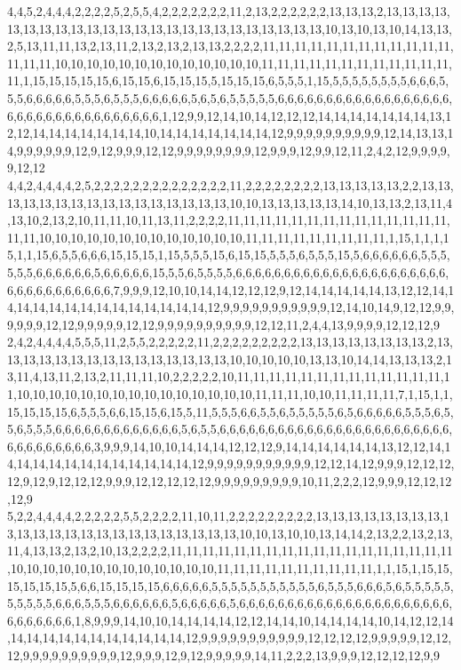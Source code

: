 4,4,5,2,4,4,4,2,2,2,2,5,2,5,5,4,2,2,2,2,2,2,2,11,2,13,2,2,2,2,2,2,13,13,13,2,13,13,13,13,13,13,13,13,13,13,13,13,13,13,13,13,13,13,13,13,13,13,13,13,10,13,10,13,10,14,13,13,2,5,13,11,11,13,2,13,11,2,13,2,13,2,13,13,2,2,2,2,11,11,11,11,11,11,11,11,11,11,11,11,11,11,11,10,10,10,10,10,10,10,10,10,10,10,10,10,11,11,11,11,11,11,11,11,11,11,11,11,11,1,15,15,15,15,15,6,15,15,6,15,15,15,5,15,15,15,6,5,5,5,1,15,5,5,5,5,5,5,5,5,6,6,6,5,5,5,6,6,6,6,6,5,5,5,6,5,5,5,6,6,6,6,6,5,6,5,6,5,5,5,5,5,6,6,6,6,6,6,6,6,6,6,6,6,6,6,6,6,6,6,6,6,6,6,6,6,6,6,6,6,6,6,6,6,6,6,1,12,9,9,12,14,10,14,12,12,12,14,14,14,14,14,14,14,13,12,12,14,14,14,14,14,14,14,10,14,14,14,14,14,14,14,12,9,9,9,9,9,9,9,9,9,9,12,14,13,13,14,9,9,9,9,9,9,12,9,12,9,9,9,12,12,9,9,9,9,9,9,9,9,12,9,9,9,12,9,9,12,11,2,4,2,12,9,9,9,9,9,12,12
4,4,2,4,4,4,4,2,5,2,2,2,2,2,2,2,2,2,2,2,2,2,2,11,2,2,2,2,2,2,2,2,13,13,13,13,13,2,2,13,13,13,13,13,13,13,13,13,13,13,13,13,13,13,13,10,10,13,13,13,13,13,14,10,13,13,2,13,11,4,13,10,2,13,2,10,11,11,10,11,13,11,2,2,2,2,11,11,11,11,11,11,11,11,11,11,11,11,11,11,11,11,10,10,10,10,10,10,10,10,10,10,10,10,10,11,11,11,11,11,11,11,11,11,1,15,1,1,1,15,1,1,15,6,5,5,6,6,6,15,15,15,1,15,5,5,5,15,6,15,15,5,5,5,6,5,5,5,15,5,6,6,6,6,6,6,5,5,5,5,5,5,6,6,6,6,6,6,5,6,6,6,6,6,15,5,5,6,5,5,5,5,6,6,6,6,6,6,6,6,6,6,6,6,6,6,6,6,6,6,6,6,6,6,6,6,6,6,6,6,6,6,6,6,6,7,9,9,9,12,10,10,14,14,12,12,12,9,12,14,14,14,14,14,13,12,12,14,14,14,14,14,14,14,14,14,14,14,14,14,14,12,9,9,9,9,9,9,9,9,9,9,9,12,14,10,14,9,12,12,9,9,9,9,9,9,12,12,9,9,9,9,9,12,12,9,9,9,9,9,9,9,9,9,9,12,12,11,2,4,4,13,9,9,9,9,12,12,12,9
2,4,2,4,4,4,4,5,5,5,11,2,5,5,2,2,2,2,2,11,2,2,2,2,2,2,2,2,2,13,13,13,13,13,13,13,13,2,13,13,13,13,13,13,13,13,13,13,13,13,13,13,13,10,10,10,10,10,13,13,10,14,14,13,13,13,2,13,11,4,13,11,2,13,2,11,11,11,10,2,2,2,2,2,10,11,11,11,11,11,11,11,11,11,11,11,11,11,11,10,10,10,10,10,10,10,10,10,10,10,10,10,10,10,11,11,11,10,10,11,11,11,11,7,1,15,1,1,15,15,15,15,6,5,5,5,6,6,15,15,6,15,5,11,5,5,5,6,6,5,5,6,5,5,5,5,5,6,5,6,6,6,6,6,5,5,5,6,5,5,6,5,5,5,6,6,6,6,6,6,6,6,6,6,6,6,6,5,6,5,5,6,6,6,6,6,6,6,6,6,6,6,6,6,6,6,6,6,6,6,6,6,6,6,6,6,6,6,6,6,6,6,6,6,3,9,9,9,14,10,10,14,14,14,12,12,12,9,14,14,14,14,14,14,13,12,12,14,14,14,14,14,14,14,14,14,14,14,14,14,12,9,9,9,9,9,9,9,9,9,9,9,12,12,14,12,9,9,9,12,12,12,12,9,12,9,12,12,12,9,9,9,12,12,12,12,12,9,9,9,9,9,9,9,9,9,10,11,2,2,2,12,9,9,9,12,12,12,12,9
5,2,2,4,4,4,4,2,2,2,2,2,5,5,2,2,2,2,11,10,11,2,2,2,2,2,2,2,2,2,13,13,13,13,13,13,13,13,13,13,13,13,13,13,13,13,13,13,13,13,13,13,13,10,10,13,10,10,13,14,14,2,13,2,2,13,2,13,11,4,13,13,2,13,2,10,13,2,2,2,2,11,11,11,11,11,11,11,11,11,11,11,11,11,11,11,11,11,11,10,10,10,10,10,10,10,10,10,10,10,10,10,11,11,11,11,11,11,11,11,11,11,1,1,15,1,15,15,15,15,15,15,5,6,6,15,15,15,15,6,6,6,6,6,5,5,5,5,5,5,5,5,5,5,5,6,5,5,5,6,6,6,5,6,5,5,5,5,5,5,5,5,5,5,6,6,6,5,5,5,6,6,6,6,6,6,5,6,6,6,6,6,5,6,6,6,6,6,6,6,6,6,6,6,6,6,6,6,6,6,6,6,6,6,6,6,6,6,6,6,6,6,1,8,9,9,9,14,10,10,14,14,14,14,12,12,14,14,10,14,14,14,14,10,14,12,12,14,14,14,14,14,14,14,14,14,14,14,14,12,9,9,9,9,9,9,9,9,9,9,9,12,12,12,12,9,9,9,9,9,12,12,12,9,9,9,9,9,9,9,9,9,9,12,9,9,9,12,9,12,9,9,9,9,9,14,11,2,2,2,13,9,9,9,12,12,12,12,9,9
